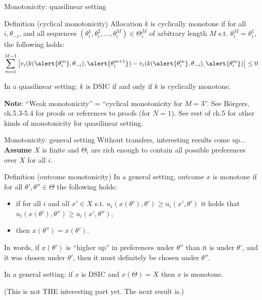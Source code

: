 \documentclass[english,10pt
,aspectratio=169
]{beamer}
\begin{document}
\begin{frame}{Monotonicity: quasilinear setting}
	\begin{exampleblock}{Definition (cyclical monotonicity)}
		Allocation $k$ is \alert{cyclically monotone} if for all $i,\theta_{-i}$, and all sequences $(\theta_i^1,\theta_i^2,...,\theta_i^M)\in \Theta_i^M$ of arbitrary length $M$ s.t. $\theta_i^M=\theta_i^1$, the following holds:
		\begin{equation*}
			\sum_{m=1}^{M-1}
			\left[
			v_{i}(k(\alert{\theta_{i}^m}, \theta_{-i}), \alert{\theta_{i}^{m+1}}) - 
			v_{i}(k(\alert{\theta_{i}^{m}}, \theta_{-i}), \alert{\theta_{i}^m}) 
			\right] 
			\leq 0
		\end{equation*}
	\end{exampleblock}
	\begin{theorem}[Rochet, 1987]
		In a quasilinear setting: $k$ is DSIC if and only if $k$ is cyclically monotone.
	\end{theorem}
	\textbf{Note}: ``Weak monotonicity'' = ``cyclical monotonicity for $M=3$''.
	See B{\"o}rgers, ch.5.3-5.4 for proofs or references to proofs (for $N=1$). See rest of ch.5 for other kinds of monotonicity for quasilinear setting.
\end{frame}


\begin{frame}{Monotonicity: general setting}
	Without transfers, interesting results come up... \\
	\textbf{Assume} $X$ is finite and $\Theta_i$ are rich enough to contain all possible preferences over $X$ for all $i$.
	\begin{exampleblock}{Definition (outcome monotonicity)}
		In a general setting, outcome $x$ is \alert{monotone} if for all $\theta',\theta'' \in \Theta$ the following holds:
		\begin{itemize}
			\item if for all $i$ and all $x' \in X$ s.t. $u_i(x(\theta'),\theta') \geq u_i(x',\theta')$ it holds that $u_i(x(\theta'),\theta'') \geq u_i(x',\theta'')$,
			\item then $x(\theta'')=x(\theta')$.
		\end{itemize}
	\end{exampleblock}
	In words, if $x(\theta')$ is ``higher up'' in preferences under $\theta''$ than it is under $\theta'$, and it was chosen under $\theta'$, then it must definitely be chosen under $\theta''$.
	\begin{theorem}
		In a general setting: if $x$ is DSIC and $x(\Theta)=X$ then $x$ is monotone.
	\end{theorem}
	(This is not THE interesting part yet. The next result is.)
\end{frame}
\end{document}
